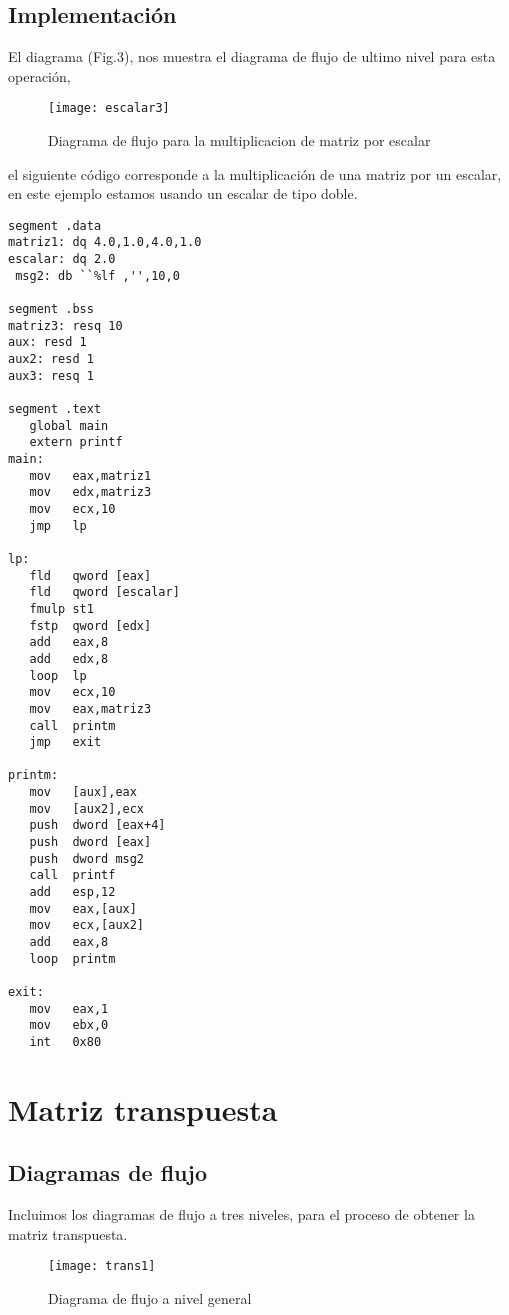 \documentclass[conference]{IEEEtran}
\begin{document}
\subsection{Implementaci\'on}
El diagrama  (Fig.3), nos muestra el diagrama de flujo de ultimo nivel para esta
operaci\'on,
\begin{figure}[!h]
\centering
\texttt{[image: escalar3]}
\caption{Diagrama de flujo para la multiplicacion de matriz por escalar}
\label{fig_sim}
\end{figure}
\vspace{0.1in}
el siguiente c\'odigo corresponde a la multiplicaci\'on de una matriz  por un escalar,
en este ejemplo estamos usando un escalar de tipo doble.
\begin{lstlisting}[language={[x86masm]Assembler}]
segment .data
matriz1: dq 4.0,1.0,4.0,1.0
escalar: dq 2.0
 msg2: db ``%lf ,'',10,0

segment .bss
matriz3: resq 10
aux: resd 1
aux2: resd 1
aux3: resq 1

segment .text
   global main
   extern printf
main:
   mov   eax,matriz1
   mov   edx,matriz3
   mov   ecx,10
   jmp   lp

lp:
   fld   qword [eax]
   fld   qword [escalar]
   fmulp st1
   fstp  qword [edx]
   add   eax,8
   add   edx,8
   loop  lp
   mov   ecx,10
   mov   eax,matriz3
   call  printm
   jmp   exit

printm:
   mov   [aux],eax
   mov   [aux2],ecx
   push  dword [eax+4]
   push  dword [eax]
   push  dword msg2
   call  printf
   add   esp,12
   mov   eax,[aux]
   mov   ecx,[aux2]
   add   eax,8
   loop  printm

exit:
   mov   eax,1
   mov   ebx,0
   int   0x80
\end{lstlisting}

\section{Matriz transpuesta}
\subsection{Diagramas de flujo}
Incluimos los diagramas de flujo a tres niveles, para el proceso de obtener la matriz
transpuesta.

\begin{figure}[!h]
\centering
\texttt{[image: trans1]}
\caption{Diagrama de flujo a nivel general}
\label{fig_sim}
\end{figure}
\vspace{0.1in}
\end{document}
